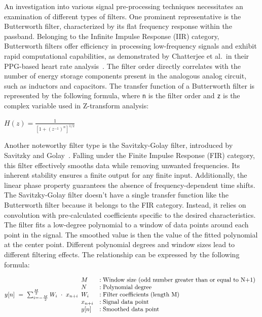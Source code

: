 An investigation into various signal pre-processing techniques necessitates an examination of different types of filters.
One prominent representative is the Butterworth filter, characterized by its flat frequency response within the passband.
Belonging to the Infinite Impulse Response (IIR) category, Butterworth filters offer efficiency in processing low-frequency signals and exhibit rapid computational capabilities, as demonstrated by Chatterjee et al.\ in their PPG-based heart rate analysis~\cite{chatterjeePPGBasedHeart2018}.
The filter order directly correlates with the number of energy storage components present in the analogous analog circuit, such as inductors and capacitors.
The transfer function of a Butterworth filter is represented by the following formula, where \texttt{n} is the filter order and \texttt{z} is the complex variable used in Z-transform analysis:~
\Large
\begin{center}
    \begin{math}
        H(z) = \frac{1}{[1 + (z^{-1})^{n}]^{1/2}}
    \end{math}
\end{center}
\normalsize

Another noteworthy filter type is the Savitzky-Golay filter, introduced by Savitzky and Golay~\cite{savitzkySmoothingDifferentiationData1964}.
Falling under the Finite Impulse Response (FIR) category, this filter effectively smooths data while removing unwanted frequencies.
Its inherent stability ensures a finite output for any finite input.
Additionally, the linear phase property guarantees the absence of frequency-dependent time shifts.
The Savitzky-Golay filter doesn't have a single transfer function like the Butterworth filter because it belongs to the FIR category.
Instead, it relies on convolution with pre-calculated coefficients specific to the desired characteristics.
The filter fits a low-degree polynomial to a window of data points around each point in the signal.
The smoothed value is then the value of the fitted polynomial at the center point.
Different polynomial degrees and window sizes lead to different filtering effects.
The relationship can be expressed by the following formula:~
\Large
\begin{center}
    \begin{math}
        y[n]~=~\sum_{i=-\frac{M}{2}}^{\frac{M}{2}} W_i~\cdot~x_{n+i} \\
        \normalsize
        \begin{array}{ll}
            M       & : \text{Window size (odd number greater than or equal to N+1)} \\
            N       & : \text{Polynomial degree}                                     \\
            W_i     & : \text{Filter coefficients (length M)}                        \\
            x_{n+i} & : \text{Signal data point}                                     \\
            y[n]    & : \text{Smoothed data point}
        \end{array}
    \end{math}
\end{center}
\normalsize

